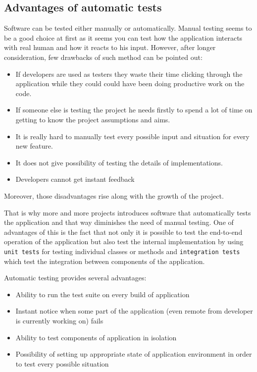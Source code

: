     \subsection{Advantages of automatic tests}
      Software can be tested either manually or automatically. Manual testing seems to be a good
      choice at first as it seems you can test how the application interacts with real human and 
      how it reacts to his input. However, after longer consideration, few drawbacks of such method
      can be pointed out:
        \begin{itemize}
          \item If developers are used as testers they waste their time clicking through the application while
          they could could have been doing productive work on the code.
          \item If someone else is testing the project he needs firstly to spend a lot of time on 
          getting to know the project assumptions and aims.
          \item It is really hard to manually test every possible input and situation for every new feature.
          \item It does not give possibility of testing the details of implementations.
          \item Developers cannot get instant feedback
        \end{itemize}
      Moreover, those disadvantages rise along with the growth of the project. 
      
      That is why more and more projects introduces software that automatically tests the application and
      that way diminishes the need of manual testing. One of advantages of this is the fact that not only
      it is possible to test the end-to-end operation of the application but also test the internal implementation
      by using \texttt{unit tests} for testing individual classes or methods and \texttt{integration tests} which
      test the integration between components of the application.
      
      Automatic testing provides several advantages:
        \begin{itemize}
          \item Ability to run the test suite on every build of application
          \item Instant notice when some part of the application (even remote from developer is currently working on)
          fails
          \item Ability to test components of application in isolation
          \item Possibility of setting up appropriate state of application environment in order to test
          every possible situation
        \end{itemize}
      

